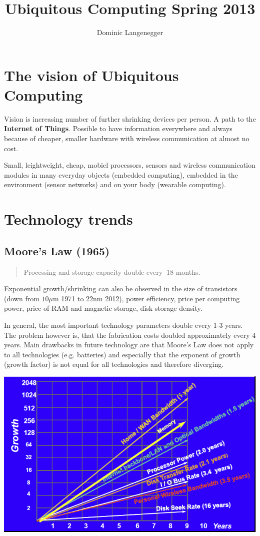 \documentclass{article}
\title{Ubiquitous Computing Spring 2013}
\author{Dominic Langenegger}
\begin{document}
\begin{multicols}{2}

\maketitle

\section{The vision of Ubiquitous Computing}
Vision is increasing number of further shrinking devices per person. A path to
the {\bf Internet of Things}. Possible to have information everywhere and always
because of cheaper, smaller hardware with wireless communication at almost no
cost.

Small, leightweight, cheap, mobiel processors, sensors and wireless
communication modules in many everyday objects (embedded computing), embedded in
the environment (sensor networks) and on your body (wearable computing).

\section{Technology trends}

\subsection{Moore's Law (1965)}

\begin{quote}
    Processing and storage capacity double every $~18$ months.
\end{quote}

Exponential growth/shrinking can also be observed in the size of transistors
(down from $10 \mu$m 1971 to $22$nm 2012), power efficiency, price per computing
power, price of RAM and magnetic storage, disk storage density.

In general, the most important technology parameters double every 1-3 years. The
problem however is, that the fabrication costs doubled approximately every 4
years. Main drawbacks in future technology are that Moore's Law does not apply
to all technologies (e.g. batteries) and especially that the exponent of growth
(growth factor) is not equal for all technologies and therefore diverging.

\includegraphics[width=0.9\linewidth]{growth-comparison}


\end{multicols}
\end{document}
